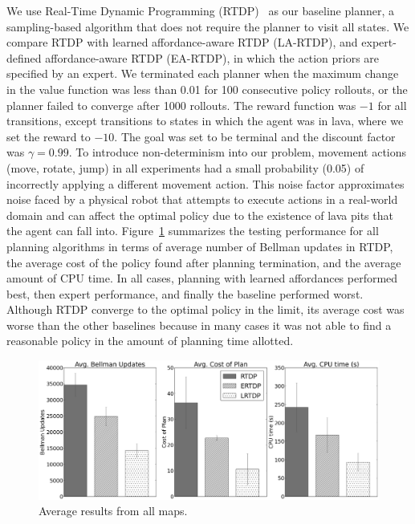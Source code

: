 We use Real-Time Dynamic Programming (RTDP)~\cite{barto95} as our
baseline planner, a sampling-based algorithm that does not require the
planner to visit all states. We compare RTDP with learned
affordance-aware RTDP (LA-RTDP), and expert-defined affordance-aware
RTDP (EA-RTDP), in which the action priors are specified by an expert. 
We terminated each planner when the maximum change in
the value function was less than 0.01 for 100 consecutive policy
rollouts, or the planner failed to converge after 1000 rollouts.  The
reward function was $-1$ for all transitions, except transitions to
states in which the agent was in lava, where we set the reward to
$-10$. The goal was set to be terminal and the discount factor was
$\gamma = 0.99$.  To introduce non-determinism into our problem,
movement actions (move, rotate, jump) in all experiments had a small
probability (0.05) of incorrectly applying a different movement
action.  This noise factor approximates noise faced by a physical
robot that attempts to execute actions in a real-world domain and
can affect the optimal policy due to the existence of lava pits
that the agent can fall into. Figure~\ref{fig:average_results}
summarizes the testing performance for all planning algorithms
in terms of average number of Bellman updates in RTDP, the average
cost of the policy found after planning termination, and the average
amount of CPU time. In all cases, planning with learned affordances
performed best, then expert performance, and finally the baseline
performed worst. Although RTDP converge to the optimal policy in the
limit, its average cost was worse than the other baselines because
in many cases it was not able to find a reasonable policy in the
amount of planning time allotted.


\begin{figure}[t]
\centering
\includegraphics[width=0.3\linewidth]{figures/average_results_cropped.png}%
\caption{Average results from all maps.}
\label{fig:average_results}
\end{figure}


